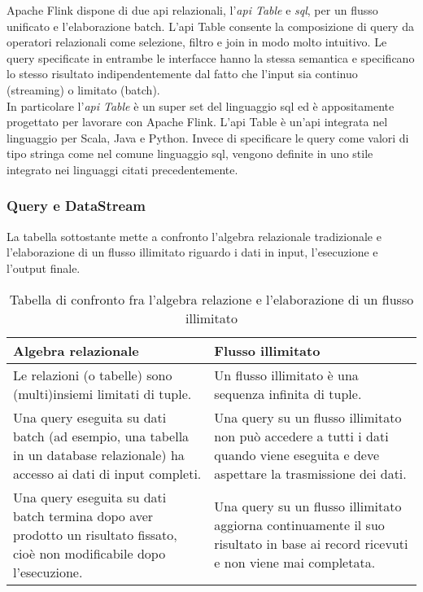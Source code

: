 Apache Flink dispone di due \gls{api} relazionali, l'\textit{\gls{api} Table} e \textit{\gls{sql}}, per un flusso unificato e l'elaborazione batch. L'\gls{api} Table consente la composizione di \gls{query} da operatori relazionali come selezione, filtro e join in modo molto intuitivo. Le \gls{query} specificate in entrambe le interfacce hanno la stessa semantica e specificano lo stesso risultato indipendentemente dal fatto che l'input sia continuo (streaming) o limitato (batch).\\
In particolare l'\textit{\gls{api} Table} è un super set del linguaggio \gls{sql} ed è appositamente progettato per lavorare con Apache Flink. L'\gls{api} Table è un'\gls{api} integrata nel linguaggio per Scala, Java e Python. Invece di specificare le \gls{query} come valori di tipo stringa come nel comune linguaggio \gls{sql}, vengono definite in uno stile integrato nei linguaggi citati precedentemente.

\subsubsection{Query e DataStream}
La tabella sottostante mette a confronto l'algebra relazionale tradizionale e l'elaborazione di un flusso illimitato riguardo i dati in input, l'esecuzione e l'output finale.

\begin{table}[hbt!]
\caption{Tabella di confronto fra l'algebra relazione e l'elaborazione di un flusso illimitato}
\label{tab:algebraRelazionale-flussoIllimitato}
\begin{tabularx}{\textwidth}{XX}
\hline
\textbf{Algebra relazionale} & \textbf{Flusso illimitato}\\
\hline
Le relazioni (o tabelle) sono (multi)insiemi limitati di tuple.     & Un flusso illimitato è una sequenza infinita di tuple. \\
\hline
Una \gls{query} eseguita su dati batch (ad esempio, una tabella in un database relazionale) ha accesso ai dati di input completi.    & Una \gls{query} su un flusso illimitato non può accedere a tutti i dati quando viene eseguita e deve aspettare la trasmissione dei dati. \\
\hline
Una \gls{query} eseguita su dati batch termina dopo aver prodotto un risultato fissato, cioè non modificabile dopo l'esecuzione. & Una \gls{query} su un flusso illimitato aggiorna continuamente il suo risultato in base ai record ricevuti e non viene mai completata. \\
\hline
\end{tabularx}
\end{table}%


